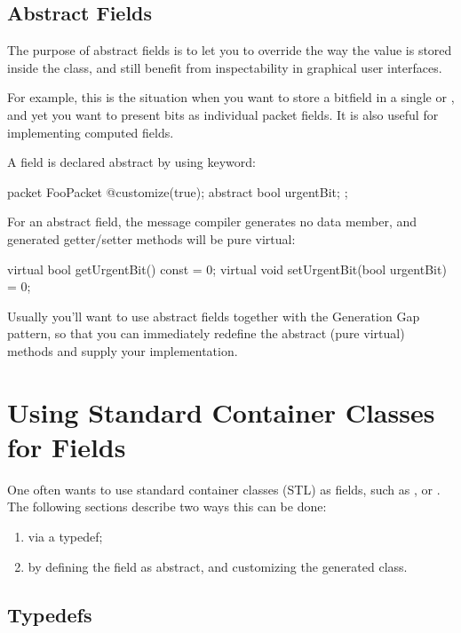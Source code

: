 \subsection{Abstract Fields}
\label{sec:msg-defs:abstract-fields}

The purpose of abstract fields is to let you to override the way the value
is stored inside the class, and still benefit from inspectability in
graphical user interfaces.

For example, this is the situation when you want to store a bitfield
in a single  or , and yet you want
to present bits as individual packet fields.
It is also useful for implementing computed fields.

A field is declared abstract by using  keyword:

\begin{msg}
packet FooPacket
{
   @customize(true);
   abstract bool urgentBit;
};
\end{msg}

For an abstract field, the message compiler generates
no data member, and generated getter/setter methods will be pure
virtual:

\begin{cpp}
virtual bool getUrgentBit() const = 0;
virtual void setUrgentBit(bool urgentBit) = 0;
\end{cpp}

Usually you'll want to use abstract fields together with
the Generation Gap pattern, so that you can immediately
redefine the abstract (pure virtual) methods and
supply your implementation.



\section{Using Standard Container Classes for Fields}
\label{sec:msg-defs:using-stl}

One often wants to use standard container classes (STL) as fields, such as
,  or . The following sections
describe two ways this can be done:

\begin{enumerate}
  \item via a typedef;
  \item by defining the field as abstract, and customizing the generated class.
\end{enumerate}

\subsection{Typedefs}
\label{sec:msg-def:typedefs}

